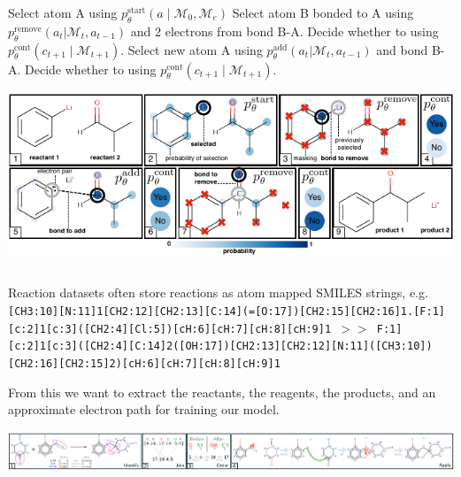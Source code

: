 \documentclass[a0paper,landscape]{tikzposter} %
\newcommand{\Mc}{{\mathcal{M}}}
\newcommand{\Ac}{{\mathcal{A}}}
\newcommand{\moleculeSet}{\Mc}
\begin{document}
\begin{columns}
{\begin{cols}
    \begin{algorithm}[H]
    \begin{algorithmic}[1]
      \State Select  atom A using 
      $p_\theta^{\mathrm{start}}(a \mid \moleculeSet_0, \moleculeSet_e)$
      \MRepeat
        \State Select atom B bonded to A using $p_\theta^{\mathrm{remove}}(a_t | \moleculeSet_t, a_{t-1})$
        and  2 electrons from bond B-A.
        \State Decide whether to  using $p_\theta^{\textrm{cont}}(c_{t+1} \mid \moleculeSet_{t+1})$.
        \State Select new atom A using $p_\theta^{\mathrm{add}}(a_t | \moleculeSet_t, a_{t-1})$ and  bond B-A.
        \State Decide whether to  using $p_\theta^{\textrm{cont}}(c_{t+1} \mid \moleculeSet_{t+1})$.
      \EndRepeat
    \end{algorithmic}
    \end{algorithm}
  { \raggedright
    \includegraphics[width=\linewidth]{imgs/reaction_model_blue.pdf}
  }


  \end{cols}

  }


\end{columns}

{
  Reaction datasets often store reactions as atom mapped SMILES strings, e.g.{ \tt  \small [CH3:10][N:11]1[CH2:12][CH2:13][C:14](=[O:17])[CH2:15][CH2:16]1.[F:1][c:2]1[c:3]([CH2:4][Cl:5])[cH:6][cH:7][cH:8][cH:9]1  $>>$
  F:1][c:2]1[c:3]([CH2:4][C:14]2([OH:17])[CH2:13][CH2:12][N:11]([CH3:10])[CH2:16][CH2:15]2)[cH:6][cH:7][cH:8][cH:9]1}

  From this we want to extract the reactants, the reagents, the products, and an approximate electron path for training our model.

\includegraphics[width=\linewidth]{imgs/inkscape_img_edits/extract_path.pdf}
}
\end{document}
